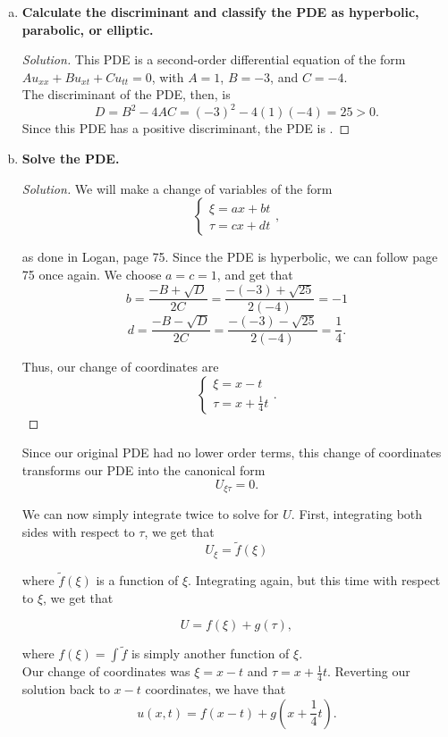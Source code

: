 \documentclass[11pt]{article}
\newenvironment{solution}
  {\renewcommand\qedsymbol{$\blacksquare$}\begin{proof}[Solution]}
  {\end{proof}}
\begin{document}
\begin{enumerate}[a)]
\item \textbf{Calculate the discriminant and classify the PDE as hyperbolic, parabolic, or elliptic.} 
\begin{solution}
This PDE is a second-order differential equation of the form $Au_{xx} + Bu_{xt} + Cu_{tt} = 0$, with $A = 1$, $B = -3$, and $C=-4.$ \\

The discriminant of the PDE, then, is \[D = B^2 - 4AC = (-3)^2 - 4(1)(-4) = \boxed{25} > 0.\]
Since this PDE has a positive discriminant, the PDE is .
\end{solution}

\item \textbf{Solve the PDE.}
\begin{solution}
We will make a change of variables of the form 
\[\begin{cases}
\xi = ax + bt \\
\tau = cx+dt
\end{cases},\]

as done in Logan, page 75. Since the PDE is hyperbolic, we can follow page 75 once again. We choose $ a = c = 1$, and get that
\[ b = \frac{-B + \sqrt{D}}{2C} = \frac{-(-3) + \sqrt{25}}{2(-4)} = -1 \]
\[ d =  \frac{-B - \sqrt{D}}{2C} = \frac{-(-3) - \sqrt{25}}{2(-4)} = \frac{1}{4}. \]

Thus, our change of coordinates are 
\[\begin{cases}
	\xi = x - t \\
	\tau = x + \frac{1}{4}t
	\end{cases}.\]
\end{solution}

Since our original PDE had no lower order terms, this change of coordinates transforms our PDE into the canonical form \[U_{\xi\tau} = 0.\]

We can now simply integrate twice to solve for $U$. First, integrating both sides with respect to $\tau$, we get that
\[U_{\xi} = \tilde{f}(\xi) \]

where $\tilde{f}(\xi)$ is a function of $\xi.$ Integrating again, but this time with respect to $\xi$, we get that

\[U = f(\xi) + g(\tau), \]

where $f(\xi) = \int \tilde{f}$ is simply another function of $\xi$. \\

Our change of coordinates was $\xi = x - t$ and $\tau = x + \frac{1}{4}t$. Reverting our solution back to $x-t$ coordinates, we have that
\[ u(x, t) = f(x-t) + g\left(x+\frac{1}{4}t\right). \]


\end{enumerate}
\end{document}
